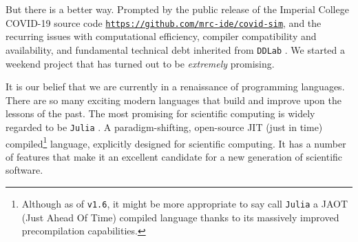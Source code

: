 But there is a better way. Prompted by the public release of the Imperial College COVID-19 source code \href{https://github.com/mrc-ide/covid-sim}{\texttt{https://github.com/mrc-ide/covid-sim}}, and the recurring issues with computational efficiency, compiler compatibility and availability, and fundamental technical debt inherited from \texttt{DDLab} \cite{ddlab}. We started a weekend project that has turned out to be \emph{extremely} promising.

It is our belief that we are currently in a renaissance of programming languages. There are so many exciting modern languages that build and improve upon the lessons of the past. The most promising for scientific computing is widely regarded to be \texttt{Julia} \cite{julia}. A paradigm-shifting, open-source JIT (just in time) compiled\footnote{Although as of \texttt{v1.6}, it might be more appropriate to say call \texttt{Julia} a JAOT (Just Ahead Of Time) compiled language thanks to its massively improved precompilation capabilities.} language, explicitly designed for scientific computing. It has a number of features that make it an excellent candidate for a new generation of scientific software.
